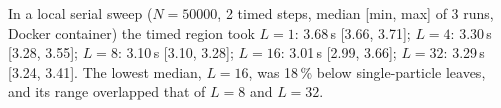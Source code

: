 In a local serial sweep ($N=50000$, 2 timed steps, median [min, max] of 3 runs, Docker container) the timed region took $L=1$: 3.68\,s [3.66, 3.71]; $L=4$: 3.30\,s [3.28, 3.55]; $L=8$: 3.10\,s [3.10, 3.28]; $L=16$: 3.01\,s [2.99, 3.66]; $L=32$: 3.29\,s [3.24, 3.41]. The lowest median, $L=16$, was 18\,\% below single-particle leaves, and its range overlapped that of $L=8$ and $L=32$.
